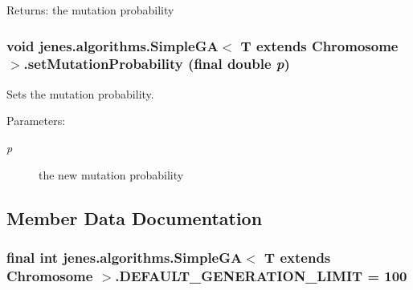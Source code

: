 \begin{Desc}
\item[Returns:]the mutation probability \end{Desc}
\hypertarget{classjenes_1_1algorithms_1_1_simple_g_a_3_01_t_01extends_01_chromosome_01_4_2ce1369d995dc328caa6b542e24e55f6}{
\subsubsection[setMutationProbability]{\setlength{\rightskip}{0pt plus 5cm}void jenes.algorithms.SimpleGA$<$ T extends Chromosome $>$.setMutationProbability (final double {\em p})}}
\label{classjenes_1_1algorithms_1_1_simple_g_a_3_01_t_01extends_01_chromosome_01_4_2ce1369d995dc328caa6b542e24e55f6}


Sets the mutation probability.

\begin{Desc}
\item[Parameters:]
\begin{description}
\item[{\em p}]the new mutation probability \end{description}
\end{Desc}


\subsection{Member Data Documentation}
\hypertarget{classjenes_1_1algorithms_1_1_simple_g_a_3_01_t_01extends_01_chromosome_01_4_c4060f400a4a9d81185713c244699d40}{
\subsubsection[DEFAULT\_\-GENERATION\_\-LIMIT]{\setlength{\rightskip}{0pt plus 5cm}final int jenes.algorithms.SimpleGA$<$ T extends Chromosome $>$.{\bf DEFAULT\_\-GENERATION\_\-LIMIT} = 100}}
\label{classjenes_1_1algorithms_1_1_simple_g_a_3_01_t_01extends_01_chromosome_01_4_c4060f400a4a9d81185713c244699d40}


